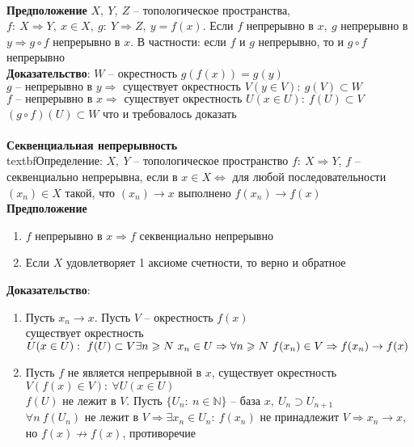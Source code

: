 	\\
	\textbf{Предположение} $X,\ Y,\ Z$ -- топологическое пространства, $f:\ X \Rightarrow Y,\ x\in X,\ g:\ Y\Rightarrow Z,\ y = f(x)$. Если $f$ непрерывно в $x,\ g$ непрерывно в $y \Rightarrow g \circ f$ непрерывно в $x$. В частности: если $f$ и $g$ непрерывно, то и $g \circ f$ непрерывно\\
	\textbf{Доказательство}: $W$ -- окрестность $g(f(x)) = g(y)$\\
	$g \text{\ -- непрерывно в\ } y \Rightarrow \text{\ существует окрестность\ } V (y\in V):\ g(V) \subset W$\\
	$f \text{\ -- непрерывно в\ } x \Rightarrow \text{\ существует окрестность\ } U(x\in U):\ f(U)\subset V$\\
	$(g \circ f)(U)\subset W$ что и требовалось доказать\\
	\\
	\textbf{Секвенциальная непрерывность}
	\\textbf{Определение}: $X,\ Y$ -- топологическое пространство $f:\ X\Rightarrow Y$, $f$ -- секвенциально непрерывна, если в $x\in X \Leftrightarrow$ для любой последовательности $(x_n) \in X$ такой, что $(x_n)\to x$ выполнено $f(x_n) \to f(x)$\\
	\textbf{Предположение} 
	\begin{enumerate}
		\item 
		$f$ непрерывно в $x \Rightarrow f$ секвенциально непрерывно
		\item 
		Если $X$ удовлетворяет 1 аксиоме счетности, то верно и обратное
	\end{enumerate}
	\textbf{Доказательство}: 
	\begin{enumerate}
		\item 
		Пусть $x_n \to x$. Пусть $V$ -- окрестность $f(x)$\\
		существует окрестность $U(x\in U):\ f(U) \subset V\\
		\exists n \geqslant N\ x_n \in U \Rightarrow \forall n\geqslant N\ f(x_n) \in V \Rightarrow f(x_n) \to f(x)$\\
		\item 
		Пусть $f$ не является непрерывной в $x$, существует окрестность $V(f(x)\in V):\ \forall U (x\in U)$\\
		$f(U)$ не лежит в $V$. Пусть $\{U_n:\ n\in \mathbb{N}\}$ -- база $x,\ U_n \supset U_{n + 1}$\\
		$\forall n\ f(U_n)$ не лежит в $V \Rightarrow \exists x_n \in U_n:\ f(x_n)$ не принадлежит $V \Rightarrow x_n \to x$, но $f(x) \nrightarrow f(x)$, противоречие\\	
	\end{enumerate}
